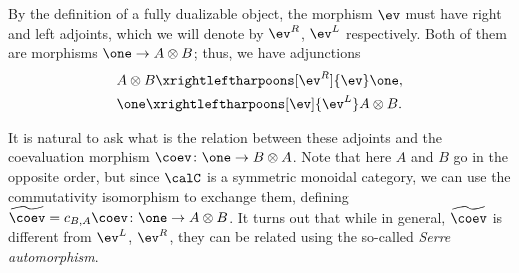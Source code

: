 By the definition of a fully dualizable object, the morphism $\ev$ must have right and
left adjoints, which we will denote by $\ev^R$, $\ev^L$ respectively. Both of
them are morphisms $\one \to A\otimes B$; thus, we have adjunctions
\begin{align*}
&A\otimes B \xrightleftharpoons[\ev^R]{\ev}\one,\\
&\one \xrightleftharpoons[\ev]{\ev^L}A \otimes B.
\end{align*}

It is natural to ask what is the relation between these adjoints and the
coevaluation morphism $\coev\colon \one \to B \otimes A$. Note that here $A$ and
$B$ go in the opposite order, but since $\calC$ is a symmetric monoidal
category, we can use the commutativity isomorphism to exchange them, defining
$\widetilde\coev = c_{B,A}\coev\colon \one \to A\otimes B$. It turns out that
while in general, $\widetilde\coev$ is different from $\ev^L$, $\ev^R$, they can
be related using the so-called \emph{Serre automorphism}.

